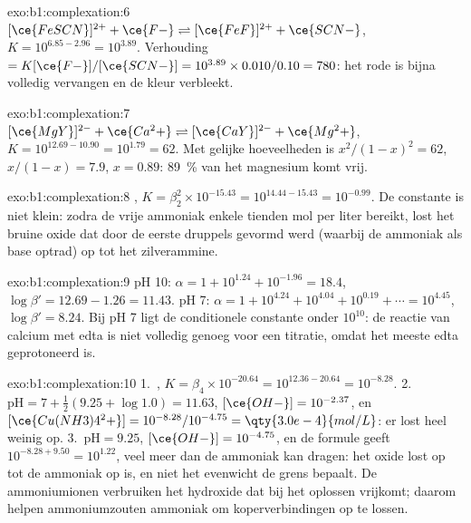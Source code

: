 \begin{solution}{exo:b1:complexation:6}
$[\ce{FeSCN}]^{2+} + \ce{F-} \rightleftharpoons [\ce{FeF}]^{2+} + \ce{SCN-}$,
$K = 10^{6.85 - 2.96} = 10^{3.89}$. Verhouding $= K[\ce{F-}]/[\ce{SCN-}] =
10^{3.89} \times 0.010/0.10 = 780$: het rode  is bijna volledig
vervangen en de kleur verbleekt.
\end{solution}

\begin{solution}{exo:b1:complexation:7}
$[\ce{MgY}]^{2-} + \ce{Ca^2+} \rightleftharpoons [\ce{CaY}]^{2-} + \ce{Mg^2+}$,
$K = 10^{12.69 - 10.90} = 10^{1.79} = 62$. Met gelijke hoeveelheden is
$x^2/(1 - x)^2 = 62$, $x/(1 - x) = 7.9$, $x = 0.89$: \qty{89}{\percent}
van het magnesium komt vrij.
\end{solution}

\begin{solution}{exo:b1:complexation:8}
, $K = \beta_2^2 \times
10^{-15.43} = 10^{14.44 - 15.43} = 10^{-0.99}$. De constante is niet
klein: zodra de vrije ammoniak enkele tienden mol per liter bereikt, lost
het bruine oxide dat door de eerste druppels gevormd werd (waarbij de
ammoniak als base optrad) op tot het zilverammine.
\end{solution}

\begin{solution}{exo:b1:complexation:9}
pH 10: $\alpha = 1 + 10^{1.24} + 10^{-1.96} = 18.4$, $\log\beta' = 12.69 -
1.26 = 11.43$. pH 7: $\alpha = 1 + 10^{4.24} + 10^{4.04} + 10^{0.19} +
\cdots = 10^{4.45}$, $\log\beta' = 8.24$. Bij pH 7 ligt de conditionele
constante onder $10^{10}$: de reactie van calcium met edta is niet
volledig genoeg voor een titratie, omdat het meeste edta geprotoneerd is.
\end{solution}

\begin{solution}{exo:b1:complexation:10}
1.~, $K = \beta_4 \times
10^{-20.64} = 10^{12.36 - 20.64} = 10^{-8.28}$.
2.~$\mathrm{pH} = 7 + \frac12(9.25 + \log 1.0) = 11.63$, $[\ce{OH-}] =
10^{-2.37}$, en $[\ce{Cu(NH3)4^2+}] = 10^{-8.28}/10^{-4.75} =
\qty{3.0e-4}{mol/L}$: er lost heel weinig op.
3.~$\mathrm{pH} = 9.25$, $[\ce{OH-}] = 10^{-4.75}$, en de formule geeft
$10^{-8.28 + 9.50} = 10^{1.22}$, veel meer dan de ammoniak kan dragen: het
oxide lost op tot de ammoniak op is, en niet het evenwicht de grens
bepaalt. De ammoniumionen verbruiken het hydroxide dat bij het oplossen
vrijkomt; daarom helpen ammoniumzouten ammoniak om koperverbindingen op
te lossen.
\end{solution}

